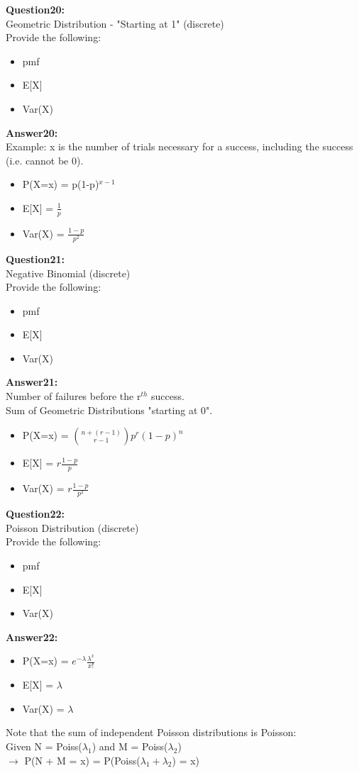 \documentclass{article}
\begin{document}
\textbf{Question20:} \\
Geometric Distribution - "Starting at 1" (discrete)\\
Provide the following:
\begin{itemize}
	\item pmf
	\item E[X]
	\item Var(X)
\end{itemize}

\textbf{Answer20:} \\
Example: x is the number of trials necessary for a success, including the success (i.e. cannot be 0).
\begin{itemize}
	\item P(X=x) = p(1-p)$^{x - 1}$
	\item E[X] = $\frac{1}{p}$
	\item Var(X) = $\frac{1 - p}{p^2}$
\end{itemize}


\textbf{Question21:} \\
Negative Binomial (discrete)\\
Provide the following:
\begin{itemize}
	\item pmf
	\item E[X]
	\item Var(X)
\end{itemize}

\textbf{Answer21:} \\
Number of failures before the r$^{th}$ success.\\
Sum of Geometric Distributions "starting at 0".
\begin{itemize}
	\item P(X=x) = $\binom{n + (r - 1)}{r - 1}p^{r}(1-p)^{n}$
	\item E[X] = $r\frac{1 - p}{p}$
	\item Var(X) = $r\frac{1 - p}{p^2}$
\end{itemize}


\textbf{Question22:} \\
Poisson Distribution (discrete)\\
Provide the following:
\begin{itemize}
	\item pmf
	\item E[X]
	\item Var(X)
\end{itemize}

\textbf{Answer22:} \\
\begin{itemize}
	\item P(X=x) = $e^{-\lambda}\frac{\lambda^x}{x!}$
	\item E[X] = $\lambda$
	\item Var(X) = $\lambda$
\end{itemize}
Note that the sum of independent Poisson distributions is Poisson: \\
Given N = Poiss($\lambda_1$) and M = Poiss($\lambda_2$) \\
$\rightarrow$ P(N + M = x) = P(Poiss($\lambda_{1} + \lambda_{2}$) = x)
\\\\
\end{document}
